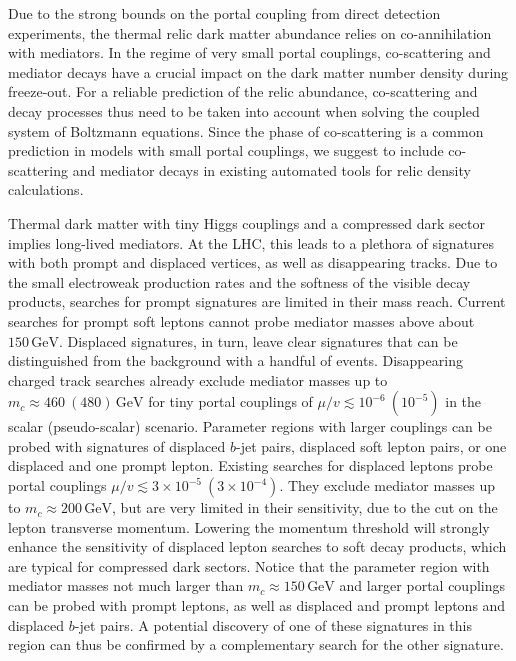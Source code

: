 \documentclass[nofootinbib,prd,aps,superscriptaddress,preprintnumbers]{revtex4}
\begin{document}
Due to the strong bounds on the portal coupling from direct detection experiments, the thermal relic dark matter abundance relies on co-annihilation with mediators. In the regime of very small portal couplings, co-scattering and mediator decays have a crucial impact on the dark matter number density during freeze-out. For a reliable prediction of the relic abundance, co-scattering and decay processes thus need to be taken into account when solving the coupled system of Boltzmann equations. Since the phase of co-scattering is a common prediction in models with small portal couplings, we suggest to include co-scattering and mediator decays in existing automated tools for relic density calculations.

Thermal dark matter with tiny Higgs couplings and a compressed dark sector implies long-lived mediators. At the LHC, this leads to a plethora of signatures with both prompt and displaced vertices, as well as disappearing tracks. Due to the small electroweak production rates and the softness of the visible decay products, searches for prompt signatures are limited in their mass reach. Current searches for prompt soft leptons cannot probe mediator masses above about $150\,\text{GeV}$. Displaced signatures, in turn, leave clear signatures that can be distinguished from the background with a handful of events. Disappearing charged track searches already exclude mediator masses up to $m_c \approx 460\ (480)\,\text{GeV}$ for tiny portal couplings of $\mu/v \lesssim 10^{-6}\ (10^{-5})$ in the scalar (pseudo-scalar) scenario. Parameter regions with larger couplings can be probed with signatures of displaced $b$-jet pairs, displaced soft lepton pairs, or one displaced and one prompt lepton. Existing searches for displaced leptons probe portal couplings $\mu/v \lesssim 3\times 10^{-5}\ (3\times 10^{-4})$. They exclude mediator masses up to $m_c \approx 200\,\text{GeV}$, but are very limited in their sensitivity, due to the cut on the lepton transverse momentum. Lowering the momentum threshold will strongly enhance the sensitivity of displaced lepton searches to soft decay products, which are typical for compressed dark sectors. Notice that the parameter region with mediator masses not much larger than $m_c \approx 150\,\text{GeV}$ and larger portal couplings can be probed with prompt leptons, as well as displaced and prompt leptons and displaced $b$-jet pairs. A potential discovery of one of these signatures in this region can thus be confirmed by a complementary search for the other signature.
\end{document}
